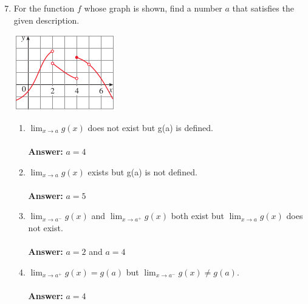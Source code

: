 \documentclass[12pt]{article}
\begin{document}
\newpage
\begin{enumerate}
\setcounter{enumi}{6}
    \item For the function $f$ whose graph is shown, find a number $a$ that satisfies the given description.
    \begin{center}
        \includegraphics{Images/Image-1.png}
    \end{center}
    \begin{enumerate}
        \item $\displaystyle{\lim_{x \to a} g(x)}$ does not exist but g(a) is defined.\\~\\
        \textbf{Answer:} $\boxed{a = 4}$\\
        \item $\displaystyle{\lim_{x \to a} g(x)}$ exists but g(a) is not defined.\\~\\
        \textbf{Answer:} $\boxed{a = 5}$\\
        \item $\displaystyle{\lim_{x \to a^-} g(x)}$ and $\displaystyle{\lim_{x \to a^+} g(x)}$ both exist but $\displaystyle{\lim_{x \to a} g(x)}$ does not exist.\\~\\
        \textbf{Answer:} $\boxed{a = 2}$ and $\boxed{a = 4}$\\
        \item $\displaystyle{\lim_{x \to a^+} g(x) = g(a)}$ but $\displaystyle{\lim_{x \to a^-} g(x) \neq g(a)}$.\\~\\
        \textbf{Answer:} $\boxed{a = 4}$\\
    \end{enumerate}
\end{enumerate}
\end{document}
